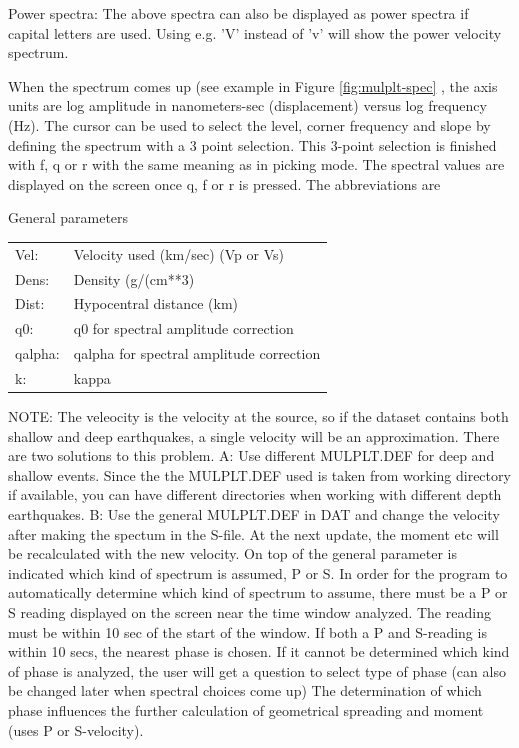 Power spectra: The above spectra can also be displayed as power spectra if capital letters are used. Using e.g. 'V' instead of 'v' will show the power velocity spectrum. 

When the spectrum comes up (see example in Figure 
\ref{fig:mulplt-spec}
, the axis units are log amplitude in nanometers-sec (displacement) versus log frequency (Hz). The cursor can be used to select the level, corner frequency and slope by defining the spectrum with a 3 point selection.  This 3-point selection is finished with f, q or r with the same meaning as in picking mode. The spectral values are displayed on the screen once q, f or r is pressed. The abbreviations are 

General parameters 

\begin{tabular}{|ll|}
\hline
Vel: & Velocity used (km/sec) (Vp or Vs) \\
Dens: & Density (g/(cm**3) \\
Dist: & Hypocentral distance (km) \\
q0: & q0 for spectral amplitude correction \\
qalpha: & qalpha for spectral amplitude correction \\
k: & kappa \\
\hline
\end{tabular}
\newline

NOTE: The veleocity is the velocity at the source, so if the dataset contains both shallow and deep earthquakes, a single velocity will be an approximation. There are two solutions to this problem. A: Use different MULPLT.DEF for deep and shallow events. Since the the MULPLT.DEF used is taken from working directory if available, you can have different directories when working with different depth earthquakes. B: Use the general MULPLT.DEF in DAT and change the velocity after making the spectum in the S-file. At the next update, the moment etc will be recalculated with the new velocity.
On top of the general parameter is indicated which kind of spectrum  is assumed, P or S. In order for the program to automatically determine which kind of spectrum to assume, there must be a P or S reading displayed on the screen near the time window analyzed.  The reading must be within 10 sec of the start of the window. If both a P and S-reading is within 10 secs, the nearest phase is chosen. If it cannot be determined which kind of phase is analyzed, the user will get a question to select type of phase (can also be changed later when spectral choices come up) The determination of which phase influences the further calculation of geometrical spreading and moment (uses P or S-velocity). 

